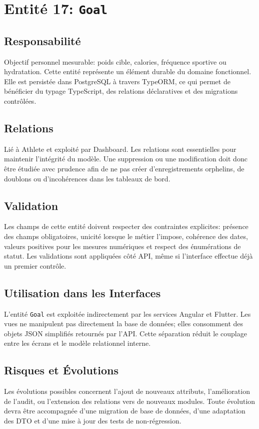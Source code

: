 \section{Entité 17: \texttt{Goal}}
\subsection{Responsabilité}
Objectif personnel mesurable: poids cible, calories, fréquence sportive ou hydratation. Cette entité représente un élément durable du domaine fonctionnel. Elle est persistée dans PostgreSQL à travers TypeORM, ce qui permet de bénéficier du typage TypeScript, des relations déclaratives et des migrations contrôlées.

\subsection{Relations}
Lié à Athlete et exploité par Dashboard. Les relations sont essentielles pour maintenir l'intégrité du modèle. Une suppression ou une modification doit donc être étudiée avec prudence afin de ne pas créer d'enregistrements orphelins, de doublons ou d'incohérences dans les tableaux de bord.

\subsection{Validation}
Les champs de cette entité doivent respecter des contraintes explicites: présence des champs obligatoires, unicité lorsque le métier l'impose, cohérence des dates, valeurs positives pour les mesures numériques et respect des énumérations de statut. Les validations sont appliquées côté API, même si l'interface effectue déjà un premier contrôle.

\subsection{Utilisation dans les Interfaces}
L'entité \texttt{Goal} est exploitée indirectement par les services Angular et Flutter. Les vues ne manipulent pas directement la base de données; elles consomment des objets JSON simplifiés retournés par l'API. Cette séparation réduit le couplage entre les écrans et le modèle relationnel interne.

\subsection{Risques et Évolutions}
Les évolutions possibles concernent l'ajout de nouveaux attributs, l'amélioration de l'audit, ou l'extension des relations vers de nouveaux modules. Toute évolution devra être accompagnée d'une migration de base de données, d'une adaptation des DTO et d'une mise à jour des tests de non-régression.

